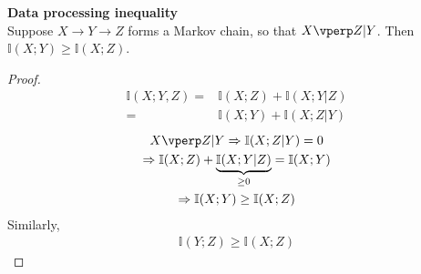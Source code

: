 \begin{theorem}
    \textbf{Data processing inequality}\\
    Suppose $X\to Y\to Z$ forms a Markov chain, so that $X\vperp Z|Y$.
    Then $\mathbb{I}(X;Y)\geq\mathbb{I}(X;Z)$.
\end{theorem}
\begin{proof}
    \begin{align}
        \mathbb{I}(X;Y,Z)
        =& \mathbb{I}(X;Z)+\mathbb{I}(X;Y|Z)\\
        =& \mathbb{I}(X;Y)+\mathbb{I}(X;Z|Y)
    \end{align}
    \begin{gather}
        X\vperp Z|Y\Rightarrow \mathbb{I}(X;Z|Y)=0\\
        \Rightarrow \mathbb{I}(X;Z)+\underbrace{\mathbb{I}(X;Y|Z)}_{\geq 0}=\mathbb{I}(X;Y) \\
        \Rightarrow \mathbb{I}(X;Y)\geq\mathbb{I}(X;Z)
    \end{gather}
    Similarly,
    \begin{gather}
        \mathbb{I}(Y;Z)\geq\mathbb{I}(X;Z)
    \end{gather}
\end{proof}
